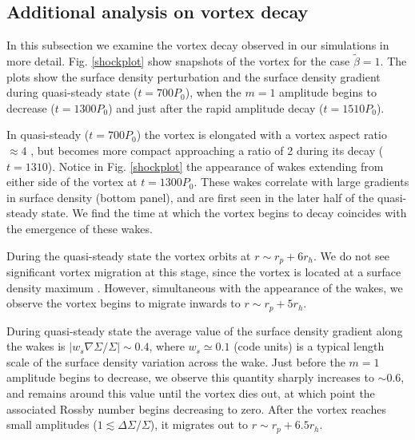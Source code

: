 
\subsection{Additional analysis on vortex decay}
In this subsection we examine the vortex decay observed in our
simulations in more detail. Fig. \ref{shockplot} show snapshots
of the vortex for the case $\tilde{\beta}=1$. The plots show the surface
density perturbation and the surface density gradient during
quasi-steady state ($t=700P_0$), when the $m=1$ amplitude begins to
decrease ($t=1300P_0$) and just after the rapid amplitude decay
($t=1510P_0$). 

In quasi-steady ($t=700P_0$) the vortex is elongated with a vortex aspect ratio $ \approx 4$
, but becomes more compact approaching a ratio of 2 during its decay ($t=1310$).   
Notice in Fig. \ref{shockplot} the appearance of wakes extending from
either side of the vortex at $t=1300P_0$. These 
wakes correlate with large gradients in surface density (bottom
panel), and are first seen in the later half of the quasi-steady
state. We find the time at which 
the vortex begins to decay coincides with the emergence of these
wakes. 

During the quasi-steady state the vortex 
  orbits at $r\sim r_p+6r_h$. We do not see significant
  vortex migration at this stage, since the vortex is located at a 
  surface density maximum \citep{paardekooper10}. However,
  simultaneous with the appearance of the wakes, we observe the vortex
  begins to migrate inwards to $r\sim r_p+5r_h$.  


During quasi-steady state the average value of the surface density gradient
along the wakes is $|w_s\nabla\Sigma/\Sigma| \sim 0.4 $, where 
$w_s\simeq0.1$ (code units) is a typical length scale of 
the surface density variation across the wake.   
Just before the $m=1$ amplitude begins to decrease, we observe this quantity
sharply increases to $ \sim 0.6 $, and remains around this value
until the vortex dies out, at which point the associated Rossby number
begins decreasing to zero. After the 
  vortex reaches small amplitudes ($1\lesssim\Delta\Sigma/\Sigma$), it 
  migrates out to $r\sim r_p+ 6.5 r_h$. 

